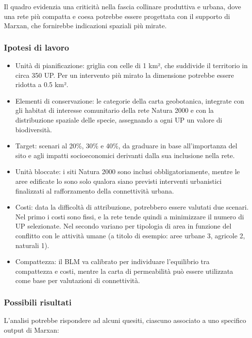 \documentclass[
  a4paper,
]{book}
\providecommand{\tightlist}{%
  \setlength{\itemsep}{0pt}\setlength{\parskip}{0pt}}
\begin{document}
Il quadro evidenzia una criticità nella fascia collinare produttiva e urbana, dove una rete più compatta e coesa potrebbe essere progettata con il supporto di Marxan, che fornirebbe indicazioni spaziali più mirate.

\subsubsection{Ipotesi di lavoro}\label{ipotesi-di-lavoro}

\begin{itemize}
\tightlist
\item
  Unità di pianificazione: griglia con celle di 1 km², che suddivide il territorio in circa 350 UP. Per un intervento più mirato la dimensione potrebbe essere ridotta a 0.5 km².
\item
  Elementi di conservazione: le categorie della carta geobotanica, integrate con gli habitat di interesse comunitario della rete Natura 2000 e con la distribuzione spaziale delle specie, assegnando a ogni UP un valore di biodiversità.
\item
  Target: scenari al 20\%, 30\% e 40\%, da graduare in base all'importanza del sito e agli impatti socioeconomici derivanti dalla sua inclusione nella rete.
\item
  Unità bloccate: i siti Natura 2000 sono inclusi obbligatoriamente, mentre le aree edificate lo sono solo qualora siano previsti interventi urbanistici finalizzati al rafforzamento della connettività urbana.
\item
  Costi: data la difficoltà di attribuzione, potrebbero essere valutati due scenari. Nel primo i costi sono fissi, e la rete tende quindi a minimizzare il numero di UP selezionate. Nel secondo variano per tipologia di area in funzione del conflitto con le attività umane (a titolo di esempio: aree urbane 3, agricole 2, naturali 1).
\item
  Compattezza: il BLM va calibrato per individuare l'equilibrio tra compattezza e costi, mentre la carta di permeabilità può essere utilizzata come base per valutazioni di connettività.
\end{itemize}

\subsubsection{Possibili risultati}\label{possibili-risultati}

L'analisi potrebbe rispondere ad alcuni quesiti, ciascuno associato a uno specifico output di Marxan:
\end{document}
